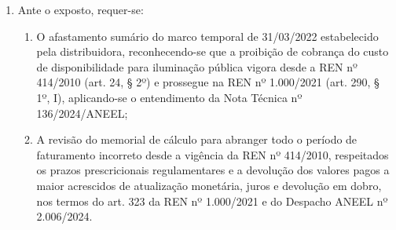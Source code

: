 \begin{enumerate}[resume]
\item Ante o exposto, requer-se:
    \begin{enumerate}
    \item O afastamento sumário do marco temporal de 31/03/2022 estabelecido pela distribuidora, reconhecendo-se que a proibição de cobrança do custo de disponibilidade para iluminação pública vigora desde a REN nº 414/2010 (art. 24, § 2º) e prossegue na REN nº 1.000/2021 (art. 290, § 1º, I), aplicando-se o entendimento da Nota Técnica nº 136/2024/ANEEL;
    \item A revisão do memorial de cálculo para abranger todo o período de faturamento incorreto desde a vigência da REN nº 414/2010, respeitados os prazos prescricionais regulamentares e a devolução dos valores pagos a maior acrescidos de atualização monetária, juros e devolução em dobro, nos termos do art. 323 da REN nº 1.000/2021 e do Despacho ANEEL nº 2.006/2024.
    \end{enumerate}
\end{enumerate}